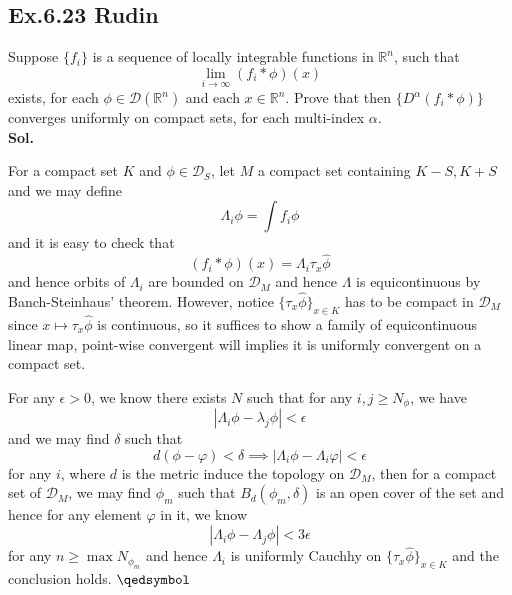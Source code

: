 \documentclass[lang=en,11pt,a4paper,citestyle =authoryear]{elegantpaper}
\newcommand{\prvd}{$\hfill \qedsymbol$}
\newcommand{\R}{\mathbb{R}}
\newcommand{\D}{\mathscr{D}}
\begin{document}
\subsection*{Ex.6.23 Rudin} 
Suppose $\{f_i\}$ is a sequence of locally integrable functions in $\R^n$, such that
\[\lim_{i\to\infty} (f_i*\phi)(x)\]
exists, for each $\phi \in \D(\R^n)$ and each $x\in\R^n$. Prove that then $\{D^{\alpha}(f_i*\phi)\}$ converges uniformly on compact sets, for each multi-index $\alpha$.
\vspace{0.5em}\\
\textbf{Sol.} \par
For a compact set $K$ and $\phi \in \D_S$, let $M$ a compact set containing $K-S,K+S$ and we may define
\[\Lambda_i \phi = \int f_i\phi\]
and it is easy to check that
\[(f_i*\phi)(x) = \Lambda_i \tau_x\hat{\phi}\]
and hence orbits of $\Lambda_i$ are bounded on $\D_M$ and hence $\Lambda$ is equicontinuous by Banch-Steinhaus' theorem. However, notice $\{\tau_x\hat{\phi}\}_{x\in K}$ has to be compact in $\D_M$ since $x\mapsto \tau_x\hat{\phi}$ is continuous, so it suffices to show a family of equicontinuous linear map, point-wise convergent will implies it is uniformly convergent on a compact set.\par
For any $\epsilon > 0$, we know there exists $N$ such that for any $i,j\geq N_{\phi}$, we have
\[
|\Lambda_i \phi - \lambda_j \phi| <\epsilon
\]
and we may find $\delta$ such that
\[d(\phi-\varphi) < \delta \implies |\Lambda_i\phi - \Lambda_i \varphi| < \epsilon\]
for any $i$, where $d$ is the metric induce the topology on $\D_M$, then for a compact set of $\D_M$, we may find $\phi_m$ such that $B_d(\phi_m,\delta)$ is an open cover of the set and hence for any element $\varphi$ in it, we know
\[
|\Lambda_i \phi - \Lambda_j \phi| < 3\epsilon
\]
for any $n\geq \max N_{\phi_m}$ and hence $\Lambda_i$ is uniformly Cauchhy on $\{\tau_x\hat{\phi}\}_{x\in K}$ and the conclusion holds.
\prvd
\end{document}
